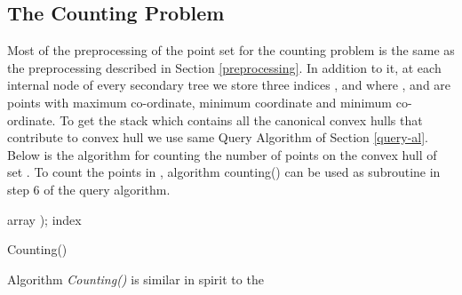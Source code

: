 \documentclass[runningheads,a4paper]{llncs}
\begin{document}
\subsection{The Counting Problem}\label{Count}
Most of the preprocessing of the point set  for the counting problem is the
same as the preprocessing described in Section \ref{preprocessing}. In
addition to it, at each internal node  of every secondary tree 
we store three indices ,  and  where
,  and  are
points with maximum  co-ordinate, minimum  coordinate and minimum 
co-ordinate.  To get the stack  which contains all the canonical convex
hulls that contribute to convex hull  we use same Query Algorithm
of Section \ref{query-al}. Below is the algorithm for counting the number of
points on the convex hull of set . To count the points in , 
algorithm counting() can be used as subroutine in step 6 of the query algorithm.
\begin{algorithm}
    array );
    index \;
    \;
     \;
 \caption{Counting()}
\end{algorithm}
\vspace{-0.7cm}
Algorithm \emph{Counting()} is similar in spirit to the
\end{document}
